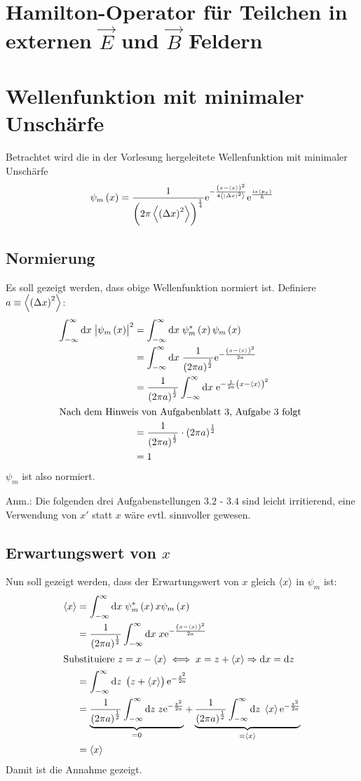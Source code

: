 \section{Hamilton-Operator für Teilchen in externen $\vec E$ und $\vec B$ Feldern}

\section{Wellenfunktion mit minimaler Unschärfe}

Betrachtet wird die in der Vorlesung hergeleitete Wellenfunktion mit minimaler Unschärfe
\[
	\psi_m\del{x}=\frac1{\del{2\pi\mw{\del{\Delta x}^2}}^{\frac14}}\ee^{-\frac{\del{x-\mw{x}}^2}{4\mw{\del{\Delta x}^2}}}
	\ee^{\frac{\ii x\mw{p_x}}{\hbar}}
\]

\subsection{Normierung}

Es soll gezeigt werden, dass obige Wellenfunktion normiert ist. Definiere $a\equiv\mw{\del{\Delta x}^2}$:
\begin{align*}
	\ui{x}\abs{\psi_m\del{x}}^2&=\ui{x}\psi_m^*\del{x}\psi_m\del{x}\\
	&=\ui{x}\frac1{\del{2\pi a}^{\frac12}}\ee^{-\frac{\del{x-\mw{x}}^2}{2a}}\\
	&=\frac1{\del{2\pi a}^{\frac12}}\ui{x}\ee^{-\frac1{2a}\del{x-\mw{x}}^2}\\
	\intertext{%
		Nach dem Hinweis von Aufgabenblatt 3, Aufgabe 3 folgt
	}
	&=\frac1{\del{2\pi a}^{\frac12}}\cdot\del{2\pi a}^{\frac12}\\
	&=1
\end{align*}
$\psi_m$ ist also normiert.

 Anm.: Die folgenden drei Aufgabenstellungen $3.2$ - $3.4$ sind leicht irritierend, eine Verwendung von $x'$ statt $x$ wäre evtl. sinnvoller gewesen.

\subsection{Erwartungswert von $x$}

Nun soll gezeigt werden, dass der Erwartungswert von $x$ gleich $\left\langle x\right\rangle$ in $\psi_m$ ist: 
\begin{align*}
	\mw{x}&=\ui{x}\psi_m^*\del{x}x\psi_m\del{x}\\
	&=\frac1{\del{2\pi a}^{\frac12}}\ui{x}x\ee^{-\frac{\del{x-\mw{x}}^2}{2a}}\\
	\intertext{%
		Substituiere $z=x-\mw{x}\iff x=z+\mw{x}\Rightarrow\dif x=\dif z$ 
	}
	&=\ui{z}\del{z+\mw{x}}\ee^{-\frac{z^2}{2a}}\\
	&=\underbrace{\frac1{\del{2\pi a}^{\frac12}}\ui{z}z\ee^{-\frac{z^2}{2a}}}_{=0}
	+\underbrace{\frac1{\del{2\pi a}^{\frac12}}\ui{z}\mw{x}\ee^{-\frac{z^2}{2a}}}_{=\mw{x}}\\
	&=\mw{x}
\end{align*}
Damit ist die Annahme gezeigt.

